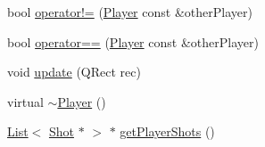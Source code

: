 \begin{DoxyCompactItemize}
\item 
bool \hyperlink{class_player_a78258f14f551447cb997c91ada49ade6}{operator!=} (\hyperlink{class_player}{Player} const \&other\-Player)
\item 
bool \hyperlink{class_player_a3221fef8a645a3d9b40eb2e3594b3f60}{operator==} (\hyperlink{class_player}{Player} const \&other\-Player)
\item 
void \hyperlink{class_player_a324a27f8b07cc82afe1c4cb67906a964}{update} (Q\-Rect rec)
\item 
virtual \hyperlink{class_player_a749d2c00e1fe0f5c2746f7505a58c062}{$\sim$\-Player} ()
\item 
\hyperlink{class_list}{List}$<$ \hyperlink{class_shot}{Shot} $\ast$ $>$ $\ast$ \hyperlink{class_player_ab221ec831c2a110ae5b631c782b6dbe7}{get\-Player\-Shots} ()
\end{DoxyCompactItemize}


